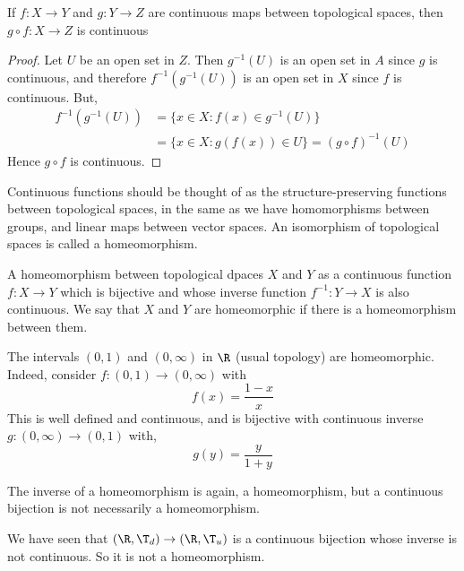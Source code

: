\begin{nlemma}[]
  If $f : X \to Y$ and $g : Y \to Z$ are continuous maps between topological spaces, then $g \circ f : X \to Z$ is continuous
\end{nlemma}
\begin{proof}
  Let $U$ be an open set in $Z$. Then $g^{-1}(U)$ is an open set in $A$ since $g$ is continuous, and therefore $f^{-1}(g^{-1}(U))$ is an open set in $X$ since $f$ is continuous. But,
  \begin{align*}
    f^{-1}(g^{-1}(U)) &= \{x \in X : f(x) \in g^{-1}(U)\}\\
    &= \{ x \in X : g(f(x)) \in U\} = (g \circ f)^{-1}(U)
  \end{align*}
  Hence $g\circ f$ is continuous.
\end{proof}

Continuous functions should be thought of as the structure-preserving functions between topological spaces, in the same as we have homomorphisms between groups, and linear maps between vector spaces. An isomorphism of topological spaces is called a homeomorphism.

\begin{ndefi}[Homeomorphism]
  A homeomorphism between topological dpaces $X$ and $Y$ as a continuous function $f : X \to Y$ which is bijective and whose inverse function $f^{-1} : Y \to X$ is also continuous. We say that $X$ and $Y$ are homeomorphic if there is a homeomorphism between them.
\end{ndefi}

\begin{eg}
  The intervals $(0, 1)$ and $(0, \infty)$ in $\R$ (usual topology) are homeomorphic. Indeed, consider $f : (0,1) \to (0, \infty)$ with
  $$ f(x) = \frac{1 - x}{x} $$
  This is well defined and continuous, and is bijective with continuous inverse $g : (0, \infty) \to (0, 1)$ with,
  $$ g(y) = \frac{y}{1 + y} $$
\end{eg}
The inverse of a homeomorphism is again, a homeomorphism, but a continuous bijection is not necessarily a homeomorphism.

\begin{eg}
  We have seen that $(\R, \T_d) \to (\R, \T_u)$ is a continuous bijection whose inverse is not continuous. So it is not a homeomorphism.
\end{eg}